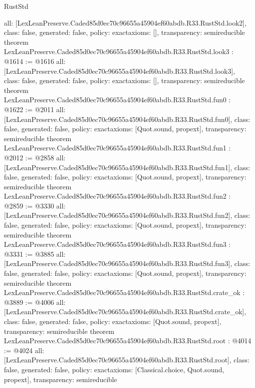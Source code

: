 \begin{lexlean}{RustStd}
\begin{coremodule}
{  all: [LexLeanPreserve.Caded85d0ec70c96655a45904ef60abdb.R33.RustStd.look2],
  class: false,
  generated: false,
  policy: exact{axioms: []},
  transparency: semireducible
}
theorem LexLeanPreserve.Caded85d0ec70c96655a45904ef60abdb.R33.RustStd.look3 : @1614 := @1616 {
  all: [LexLeanPreserve.Caded85d0ec70c96655a45904ef60abdb.R33.RustStd.look3],
  class: false,
  generated: false,
  policy: exact{axioms: []},
  transparency: semireducible
}
theorem LexLeanPreserve.Caded85d0ec70c96655a45904ef60abdb.R33.RustStd.fun0 : @1622 := @2011 {
  all: [LexLeanPreserve.Caded85d0ec70c96655a45904ef60abdb.R33.RustStd.fun0],
  class: false,
  generated: false,
  policy: exact{axioms: [Quot.sound, propext]},
  transparency: semireducible
}
theorem LexLeanPreserve.Caded85d0ec70c96655a45904ef60abdb.R33.RustStd.fun1 : @2012 := @2858 {
  all: [LexLeanPreserve.Caded85d0ec70c96655a45904ef60abdb.R33.RustStd.fun1],
  class: false,
  generated: false,
  policy: exact{axioms: [Quot.sound, propext]},
  transparency: semireducible
}
theorem LexLeanPreserve.Caded85d0ec70c96655a45904ef60abdb.R33.RustStd.fun2 : @2859 := @3330 {
  all: [LexLeanPreserve.Caded85d0ec70c96655a45904ef60abdb.R33.RustStd.fun2],
  class: false,
  generated: false,
  policy: exact{axioms: [Quot.sound, propext]},
  transparency: semireducible
}
theorem LexLeanPreserve.Caded85d0ec70c96655a45904ef60abdb.R33.RustStd.fun3 : @3331 := @3885 {
  all: [LexLeanPreserve.Caded85d0ec70c96655a45904ef60abdb.R33.RustStd.fun3],
  class: false,
  generated: false,
  policy: exact{axioms: [Quot.sound, propext]},
  transparency: semireducible
}
theorem LexLeanPreserve.Caded85d0ec70c96655a45904ef60abdb.R33.RustStd.crate_ok : @3889 := @4006 {
  all: [LexLeanPreserve.Caded85d0ec70c96655a45904ef60abdb.R33.RustStd.crate_ok],
  class: false,
  generated: false,
  policy: exact{axioms: [Quot.sound, propext]},
  transparency: semireducible
}
theorem LexLeanPreserve.Caded85d0ec70c96655a45904ef60abdb.R33.RustStd.root : @4014 := @4024 {
  all: [LexLeanPreserve.Caded85d0ec70c96655a45904ef60abdb.R33.RustStd.root],
  class: false,
  generated: false,
  policy: exact{axioms: [Classical.choice, Quot.sound, propext]},
  transparency: semireducible
}


\end{coremodule}
\end{lexlean}

